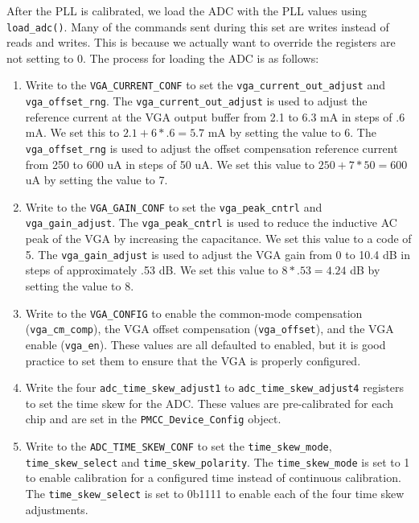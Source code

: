 After the PLL is calibrated, we load the ADC with the PLL values using \texttt{load\_adc()}.
Many of the commands sent during this set are writes instead of reads and writes.
This is because we actually want to override the registers are not setting to 0.
The process for loading the ADC is as follows:
\begin{enumerate}
    \item 
        Write to the \texttt{VGA\_CURRENT\_CONF} to set the \texttt{vga\_current\_out\_adjust} and \texttt{vga\_offset\_rng}.
        The \texttt{vga\_current\_out\_adjust} is used to adjust the reference current at the VGA output buffer from 2.1 to 6.3 mA in steps of .6 mA.
        We set this to $2.1 + 6 * .6 = 5.7$ mA by setting the value to 6.
        The \texttt{vga\_offset\_rng} is used to adjust the offset compensation reference current from 250 to 600 uA in steps of 50 uA.
        We set this value to $250 + 7 * 50 = 600$ uA by setting the value to 7.
    \item 
        Write to the \texttt{VGA\_GAIN\_CONF} to set the \texttt{vga\_peak\_cntrl} and \texttt{vga\_gain\_adjust}.
        The \texttt{vga\_peak\_cntrl} is used to reduce the inductive AC peak of the VGA by increasing the capacitance.
        We set this value to a code of 5.
        The \texttt{vga\_gain\_adjust} is used to adjust the VGA gain from 0 to 10.4 dB in steps of approximately .53 dB.
        We set this value to $8 * .53 = 4.24$ dB by setting the value to 8.
    \item 
        Write to the \texttt{VGA\_CONFIG} to enable the common-mode compensation (\texttt{vga\_cm\_comp}), the VGA offset compensation (\texttt{vga\_offset}), and the VGA enable (\texttt{vga\_en}).
        These values are all defaulted to enabled, but it is good practice to set them to ensure that the VGA is properly configured.
    \item 
        Write the four \texttt{adc\_time\_skew\_adjust1} to \texttt{adc\_time\_skew\_adjust4} registers to set the time skew for the ADC.
        These values are pre-calibrated for each chip and are set in the \texttt{PMCC\_Device\_Config} object.
    \item 
        Write to the \texttt{ADC\_TIME\_SKEW\_CONF} to set the \texttt{time\_skew\_mode}, \texttt{time\_skew\_select} and \texttt{time\_skew\_polarity}.
        The \texttt{time\_skew\_mode} is set to 1 to enable calibration for a configured time instead of continuous calibration.
        The \texttt{time\_skew\_select} is set to 0b1111 to enable each of the four time skew adjustments.

\end{enumerate}
